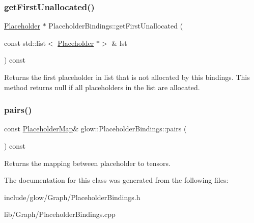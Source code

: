 \subsubsection{\texorpdfstring{get\+First\+Unallocated()}{getFirstUnallocated()}}
{\footnotesize\ttfamily \hyperlink{classglow_1_1_placeholder}{Placeholder} $\ast$ Placeholder\+Bindings\+::get\+First\+Unallocated (\begin{DoxyParamCaption}\item[{const std\+::list$<$ \hyperlink{classglow_1_1_placeholder}{Placeholder} $\ast$$>$ \&}]{lst }\end{DoxyParamCaption}) const}

\begin{DoxyReturn}{Returns}
the first placeholder in {\ttfamily list} that is not allocated by this bindings. This method returns null if all placeholders in the list are allocated. 
\end{DoxyReturn}
\mbox{\label{classglow_1_1_placeholder_bindings_a1652efb98579b145068c17ddcbb5bfb4}} 
\subsubsection{\texorpdfstring{pairs()}{pairs()}}
{\footnotesize\ttfamily const \hyperlink{classglow_1_1_placeholder_bindings_ae0ff382e6d2719f72120f35909dd1862}{Placeholder\+Map}\& glow\+::\+Placeholder\+Bindings\+::pairs (\begin{DoxyParamCaption}{ }\end{DoxyParamCaption}) const\hspace{0.3cm}{\ttfamily [inline]}}

\begin{DoxyReturn}{Returns}
the mapping between placeholder to tensors. 
\end{DoxyReturn}


The documentation for this class was generated from the following files\+:\begin{DoxyCompactItemize}
\item 
include/glow/\+Graph/Placeholder\+Bindings.\+h\item 
lib/\+Graph/Placeholder\+Bindings.\+cpp\end{DoxyCompactItemize}
